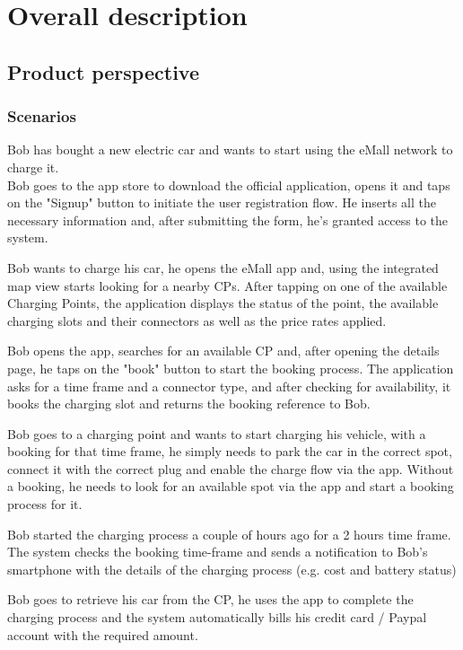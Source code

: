 \chapter{Overall description}
\section{Product perspective}
\subsection{Scenarios}

\begin{enumerate}
	Bob has bought a new electric car and wants to start using the eMall network to charge it.\\ Bob goes to the app store to download the official application, opens it and taps on the "Signup" button to initiate the user registration flow. He inserts all the necessary information and, after submitting the form, he's granted access to the system. 
	
	Bob wants to charge his car, he opens the eMall app and, using the integrated map view starts looking for a nearby CPs. After tapping on one of the available Charging Points, the application displays the status of the point, the available charging slots and their connectors as well as the price rates applied.
	
	Bob opens the app, searches for an available CP and, after opening the details page, he taps on the "book" button to start the booking process. The application asks for a time frame and a connector type, and after checking for availability, it books the charging slot and returns the booking reference to Bob.
	
	Bob goes to a charging point and wants to start charging his vehicle, with a booking for that time frame, he simply needs to park the car in the correct spot, connect it with the correct plug and enable the charge flow via the app. Without a booking, he needs to look for an available spot via the app and start a booking process for it.
	
	Bob started the charging process a couple of hours ago for a 2 hours time frame. The system checks the booking time-frame and sends a notification to Bob's smartphone with the details of the charging process (e.g. cost and battery status)
	
	Bob goes to retrieve his car from the CP, he uses the app to complete the charging process and the system automatically bills his credit card / Paypal account with the required amount.
\end{enumerate}

